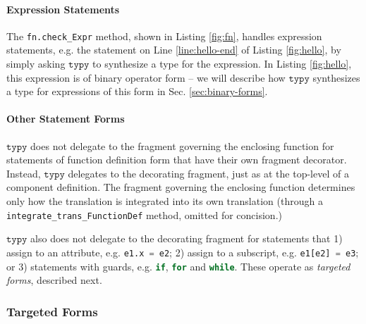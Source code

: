 \documentclass[preprint,10pt]{sigplanconf}
\newcommand{\typy}{\texttt{typy}}
\newcommand{\lip}[1]{\lstinline[language=Python,basicstyle=\ttfamily\footnotesize,deletendkeywords={tuple,buffer,map}]{#1}}
\newcommand{\li}[1]{\lip{#1}}
\begin{document}
\vspace{-3px}\paragraph{Expression Statements} The \li{fn.check_Expr} method, shown in Listing \ref{fig:fn}, handles expression statements, e.g. the statement on Line \ref{line:hello-end} of Listing \ref{fig:hello}, by simply asking $\typy$ to synthesize a type for the expression. In Listing \ref{fig:hello}, this expression is of binary operator form -- we will describe how $\typy$ synthesizes a type for expressions of this form in Sec. \ref{sec:binary-forms}. 

\vspace{-3px}\paragraph{Other Statement Forms}
$\typy$ does not delegate to the fragment governing the enclosing function for statements of function definition form that have their own fragment decorator. Instead, $\typy$ delegates to the decorating fragment, just as at the top-level of a component definition. The fragment governing the enclosing function determines only how the translation is integrated into its own translation (through a \li{integrate_trans_FunctionDef} method, omitted for concision.)

$\typy$ also does not delegate to the decorating fragment for statements that 1) assign to an attribute, e.g. \li{e1.x = e2};  2) assign to a subscript, e.g. \li{e1[e2] = e3}; or 3) statements with guards, e.g. \li{if}, \li{for} and \li{while}.  These operate as \emph{targeted forms}, described next.

\subsubsection{Targeted Forms}\label{sec:targeted-forms}
\end{document}
